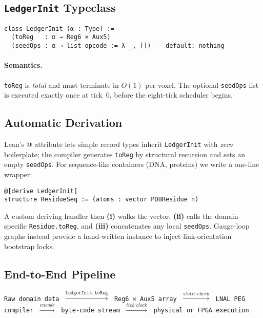 \documentclass[11pt,a4paper]{article}
\begin{document}
\subsection{\texttt{LedgerInit} Typeclass}
\label{subsec:ledgerinit}

\begin{verbatim}
class LedgerInit (α : Type) :=
  (toReg   : α → Reg6 × Aux5)
  (seedOps : α → list opcode := λ _, []) -- default: nothing
\end{verbatim}

\paragraph{Semantics.}
\texttt{toReg} is \emph{total} and must terminate in
$O(1)$ per voxel.  The optional \texttt{seedOps} list is executed
exactly once at tick~$0$, before the eight-tick scheduler begins.

\subsection{Automatic Derivation}
\label{subsec:derive}

Lean’s \verb@[derive]@ attribute lets
simple record types inherit \texttt{LedgerInit}
with \emph{zero} boilerplate; the compiler generates
\texttt{toReg} by structural recursion and sets an empty
\texttt{seedOps}.  For sequence-like containers (DNA, proteins)
we write a one-line wrapper:

\begin{verbatim}
@[derive LedgerInit]
structure ResidueSeq := (atoms : vector PDBResidue n)
\end{verbatim}

\noindent
A custom deriving handler then
\textbf{(i)} walks the vector, \textbf{(ii)}
calls the domain-specific \texttt{Residue.toReg},
and \textbf{(iii)} concatenates any local \texttt{seedOps}.
Gauge-loop graphs instead provide a hand-written instance to
inject link-orientation bootstrap locks.

\subsection{End-to-End Pipeline}
\label{subsec:pipeline}

\begin{center}
\verb|Raw domain data| $\;\xrightarrow{\texttt{LedgerInit::toReg}}\;$
\verb|Reg6 × Aux5 array| $\;\xrightarrow{\textit{static check}}\;$
\verb|LNAL PEG compiler| $\;\xrightarrow{\textit{encode}}\;$
\verb|byte-code stream| $\;\xrightarrow{\textit{tick clock}}\;$
\verb|physical or FPGA execution|
\end{center}
\end{document}
